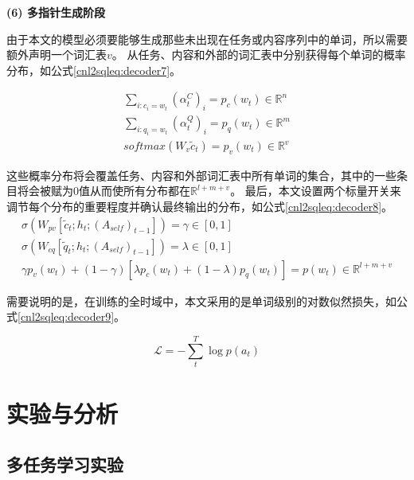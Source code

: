 \textbf{(6) 多指针生成阶段}

由于本文的模型必须要能够生成那些未出现在任务或内容序列中的单词，所以需要额外声明一个词汇表$v$。
从任务、内容和外部的词汇表中分别获得每个单词的概率分布，如公式\ref{cnl2sqleq:decoder7}。

\begin{gather}
  \label{cnl2sqleq:decoder7}
  \sum_{i:c_i=w_t} (\alpha^C_t)_i = p_c(w_t) \in \mathbb{R}^{n}\\
  \sum_{i:q_i=w_t} (\alpha^Q_t)_i = p_q(w_t) \in \mathbb{R}^{m}\\
  softmax(W_v\widetilde{c}_t) = p_v(w_t) \in \mathbb{R}^{v}
\end{gather}

这些概率分布将会覆盖任务、内容和外部词汇表中所有单词的集合，其中的一些条目将会被赋为0值从而使所有分布都在$\mathbb{R}^{l+m+v}$。
最后，本文设置两个标量开关来调节每个分布的重要程度并确认最终输出的分布，如公式\ref{cnl2sqleq:decoder8}。
\begin{gather}
  \label{cnl2sqleq:decoder8}
  \sigma (W_{pv}[\widetilde{c}_t;h_t;(A_{self})_{t-1}]) = \gamma \in [0,1]\\
  \sigma (W_{cq}[\widetilde{q}_t;h_t;(A_{self})_{t-1}]) = \lambda \in [0,1]\\
  \gamma p_v(w_t) + (1 - \gamma)[\lambda p_c(w_t) + (1 - \lambda)p_q(w_t)] = p(w_t) \in \mathbb{R}^{l+m+v}
\end{gather}

需要说明的是，在训练的全时域中，本文采用的是单词级别的对数似然损失，如公式\ref{cnl2sqleq:decoder9}。

\begin{equation}
  \label{cnl2sqleq:decoder9}
  \mathcal L = -\sum^T_t \log p(a_t)
\end{equation}


\section{实验与分析}
\label{cnl2sql:syyfx}
\subsection{多任务学习实验}


